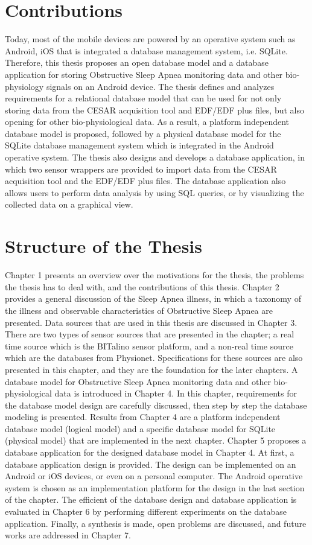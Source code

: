 \section{Contributions}
Today, most of the mobile devices are powered by an operative system such as Android, iOS that is integrated a database management system, i.e. SQLite. Therefore, this thesis proposes an open database model and a database application for storing Obstructive Sleep Apnea monitoring data and other bio-physiology signals on an Android device. The thesis defines and analyzes requirements for a relational database model that can be used for not only storing data from the CESAR acquisition tool and EDF/EDF plus files, but also opening for other bio-physiological data. As a result, a platform independent database model is proposed, followed by a physical database model for the SQLite database management system which is integrated in the Android operative system. The thesis also designs and develops a database application, in which two sensor wrappers are provided to import data from the CESAR acquisition tool and the EDF/EDF plus files. The database application also allows users to perform data analysis by using SQL queries, or by visualizing the collected data on a graphical view.
\section{Structure of the Thesis}
Chapter 1 presents an overview over the motivations for the thesis, the problems the thesis has to deal with, and the contributions of this thesis. Chapter 2 provides a general discussion of the Sleep Apnea illness, in which a taxonomy of the illness and observable characteristics of Obstructive Sleep Apnea are presented. Data sources that are used in this thesis are discussed in Chapter 3. There are two types of sensor sources that are presented in the chapter; a real time source which is the BITalino sensor platform, and a non-real time source which are the databases from Physionet. Specifications for these sources are also presented in this chapter, and they are the foundation for the later chapters. A database model for Obstructive Sleep Apnea monitoring data and other bio-physiological data is introduced in Chapter 4. In this chapter, requirements for the database model design are carefully discussed, then step by step the database modeling is presented. Results from Chapter 4 are a platform independent database model (logical model) and a specific database model for SQLite (physical model) that are implemented in the next chapter. Chapter 5 proposes a database application for the designed database model in Chapter 4. At first, a database application design is provided. The design can be implemented on an Android or iOS devices, or even on a personal computer. The Android operative system is chosen as an implementation platform for the design in the last section of the chapter. The efficient of the database design and database application is evaluated in Chapter 6 by performing different experiments on the database application. Finally, a synthesis is made, open problems are discussed, and future works are addressed in Chapter 7.
